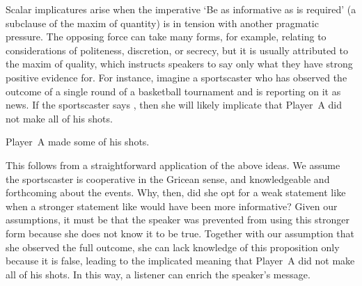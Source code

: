 \documentclass[leqno]{article}
\begin{document}
Scalar implicatures arise when the imperative `Be as informative as is
required' (a subclause of the maxim of quantity) is in tension with
another pragmatic pressure. The opposing force can take many forms,
for example, relating to considerations of politeness, discretion, or
secrecy, but it is usually attributed to the maxim of quality, which
instructs speakers to say only what they have strong positive evidence
for. For instance, imagine a sportscaster who has observed the outcome
of a single round of a basketball tournament and is reporting on it as
news. If the sportscaster says , then she will likely
implicate that Player~A did not make all of his shots.
%
\begin{examples}
\item\label{some} Player~A made some of his shots.
\end{examples}

This follows from a straightforward application of the above ideas. We
assume the sportscaster is cooperative in the Gricean sense, and
knowledgeable and forthcoming about the events. Why, then, did she opt
for a weak statement like  when
a stronger statement like  would
have been more informative? Given our assumptions, it must be that the
speaker was prevented from using this stronger form because she does
not know it to be true. Together with our assumption that she observed
the full outcome, she can lack knowledge of this proposition only
because it is false, leading to the implicated meaning that Player~A
did not make all of his shots. In this way, a listener can enrich the
speaker's message.
\end{document}
